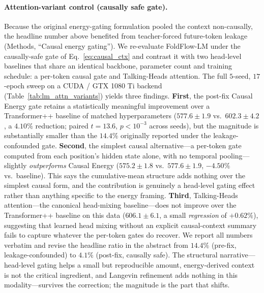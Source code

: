 \documentclass[fleqn,10pt]{article}
\begin{document}
\paragraph{Attention-variant control (causally safe gate).}
Because the original energy-gating formulation pooled the context
non-causally, the headline number above benefited from teacher-forced
future-token leakage (Methods, ``Causal energy gating''). We
re-evaluate FoldFlow-LM under the causally-safe gate of
Eq.~\ref{eq:causal_ctx} and contrast it with two head-level baselines
that share an identical backbone, parameter count and training
schedule: a per-token causal gate and Talking-Heads
attention.\cite{shazeer2020talkingheads} The full $5$-seed,
$17$-epoch sweep on a CUDA / GTX 1080 Ti backend
(Table~\ref{tab:lm_attn_variants}) yields three findings.
\textbf{First}, the post-fix Causal Energy gate retains a statistically
meaningful improvement over a Transformer++ baseline of matched
hyperparameters ($577.6 \pm 1.9$ vs.\ $602.3 \pm 4.2$, a
$\mathbf{4.10\%}$ reduction; paired $t = 13.6$, $p < 10^{-3}$ across
seeds), but the magnitude is substantially smaller than the
$14.4\%$ originally reported under the leakage-confounded gate.
\textbf{Second}, the simplest causal alternative---a per-token gate
computed from each position's hidden state alone, with no temporal
pooling---slightly \emph{outperforms} Causal Energy ($575.2 \pm 1.8$
vs.\ $577.6 \pm 1.9$, $-4.50\%$ vs.\ baseline). This says the
cumulative-mean structure adds nothing over the simplest causal
form, and the contribution is genuinely a head-level gating effect
rather than anything specific to the energy framing.
\textbf{Third}, Talking-Heads attention---the canonical head-mixing
baseline---does not improve over
the Transformer++ baseline on this data ($606.1 \pm 6.1$, a small
\emph{regression} of $+0.62\%$), suggesting that learned head
mixing without an explicit causal-context summary fails to capture
whatever the per-token gates do recover. We report all numbers
verbatim and revise the headline ratio in the abstract from
$14.4\%$ (pre-fix, leakage-confounded) to $4.1\%$ (post-fix,
causally safe). The structural narrative---head-level gating helps a
small but reproducible amount, energy-derived context is not the
critical ingredient, and Langevin refinement adds nothing in this
modality---survives the correction; the magnitude is the part that
shifts.
\end{document}

